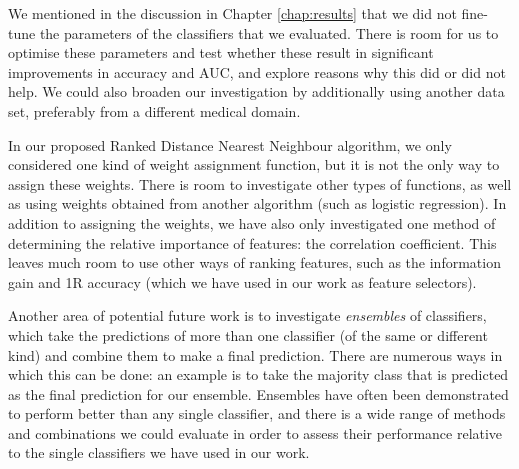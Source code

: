 We mentioned in the discussion in Chapter \ref{chap:results} that we did not
fine-tune the parameters of the classifiers that we evaluated. There is room
for us to optimise these parameters and test whether these result in
significant improvements in accuracy and AUC, and explore reasons why this
did or did not help. We could also broaden our investigation by additionally
using another data set, preferably from a different medical domain.

In our proposed Ranked Distance Nearest Neighbour algorithm, we only considered
one kind of weight assignment function, but it is not the only way to assign
these weights. There is room to investigate other types of functions, as well
as using weights obtained from another algorithm (such as logistic regression).
In addition to assigning the weights, we have also only investigated one method
of determining the relative importance of features: the correlation coefficient.
This leaves much room to use other ways of ranking features, such as the
information gain and 1R accuracy (which we have used in our work as feature
selectors).

Another area of potential future work is to investigate \textit{ensembles} of
classifiers, which take the predictions of more than one classifier (of the
same or different kind) and combine them to make a final prediction. There are
numerous ways in which this can be done: an example is to take the majority
class that is predicted as the final prediction for our ensemble. Ensembles
have often been demonstrated to perform better than any single classifier,
and there is a wide range of methods and combinations we could evaluate in
order to assess their performance relative to the single classifiers we have
used in our work.
